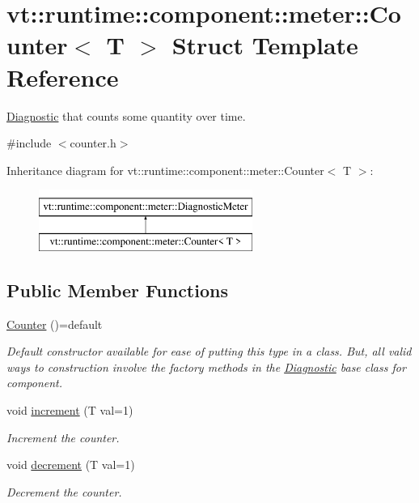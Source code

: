 \hypertarget{structvt_1_1runtime_1_1component_1_1meter_1_1_counter}{}\section{vt\+:\+:runtime\+:\+:component\+:\+:meter\+:\+:Counter$<$ T $>$ Struct Template Reference}
\label{structvt_1_1runtime_1_1component_1_1meter_1_1_counter}


\hyperlink{structvt_1_1runtime_1_1component_1_1_diagnostic}{Diagnostic} that counts some quantity over time.  




{\ttfamily \#include $<$counter.\+h$>$}

Inheritance diagram for vt\+:\+:runtime\+:\+:component\+:\+:meter\+:\+:Counter$<$ T $>$\+:\begin{figure}[H]
\begin{center}
\leavevmode
\includegraphics[height=2.000000cm]{structvt_1_1runtime_1_1component_1_1meter_1_1_counter}
\end{center}
\end{figure}
\subsection*{Public Member Functions}
\begin{DoxyCompactItemize}
\item 
\hyperlink{structvt_1_1runtime_1_1component_1_1meter_1_1_counter_afbe8191f66fc515812ee5bf1b5d857a8}{Counter} ()=default
\begin{DoxyCompactList}\small\item\em Default constructor available for ease of putting this type in a class. But, all valid ways to construction involve the factory methods in the {\ttfamily \hyperlink{structvt_1_1runtime_1_1component_1_1_diagnostic}{Diagnostic}} base class for component. \end{DoxyCompactList}\item 
void \hyperlink{structvt_1_1runtime_1_1component_1_1meter_1_1_counter_a5bd034dd4cc31c824242ac92e6cdeaee}{increment} (T val=1)
\begin{DoxyCompactList}\small\item\em Increment the counter. \end{DoxyCompactList}\item 
void \hyperlink{structvt_1_1runtime_1_1component_1_1meter_1_1_counter_a020d52d2540855c661003bb50265e7db}{decrement} (T val=1)
\begin{DoxyCompactList}\small\item\em Decrement the counter. \end{DoxyCompactList}\end{DoxyCompactItemize}
